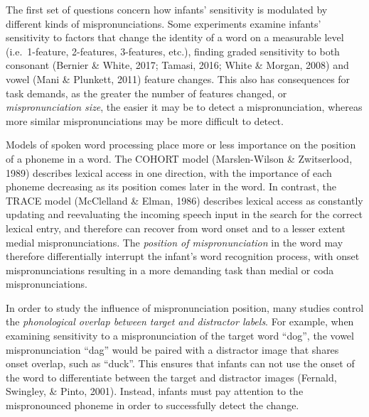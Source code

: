 \documentclass[man]{apa6}
\begin{document}
The first set of questions concern how infants' sensitivity is modulated by different kinds of mispronunciations. Some experiments examine infants' sensitivity to factors that change the identity of a word on a measurable level (i.e.~1-feature, 2-features, 3-features, etc.), finding graded sensitivity to both consonant (Bernier \& White, 2017; Tamasi, 2016; White \& Morgan, 2008) and vowel (Mani \& Plunkett, 2011) feature changes. This also has consequences for task demands, as the greater the number of features changed, or \emph{mispronunciation size}, the easier it may be to detect a mispronunciation, whereas more similar mispronunciations may be more difficult to detect.

Models of spoken word processing place more or less importance on the position of a phoneme in a word. The COHORT model (Marslen-Wilson \& Zwitserlood, 1989) describes lexical access in one direction, with the importance of each phoneme decreasing as its position comes later in the word. In contrast, the TRACE model (McClelland \& Elman, 1986) describes lexical access as constantly updating and reevaluating the incoming speech input in the search for the correct lexical entry, and therefore can recover from word onset and to a lesser extent medial mispronunciations. The \emph{position of mispronunciation} in the word may therefore differentially interrupt the infant's word recognition process, with onset mispronunciations resulting in a more demanding task than medial or coda mispronunciations.

In order to study the influence of mispronunciation position, many studies control the \emph{phonological overlap between target and distractor labels}. For example, when examining sensitivity to a mispronunciation of the target word \enquote{dog}, the vowel mispronunciation \enquote{dag} would be paired with a distractor image that shares onset overlap, such as \enquote{duck}. This ensures that infants can not use the onset of the word to differentiate between the target and distractor images (Fernald, Swingley, \& Pinto, 2001). Instead, infants must pay attention to the mispronounced phoneme in order to successfully detect the change.
\end{document}
